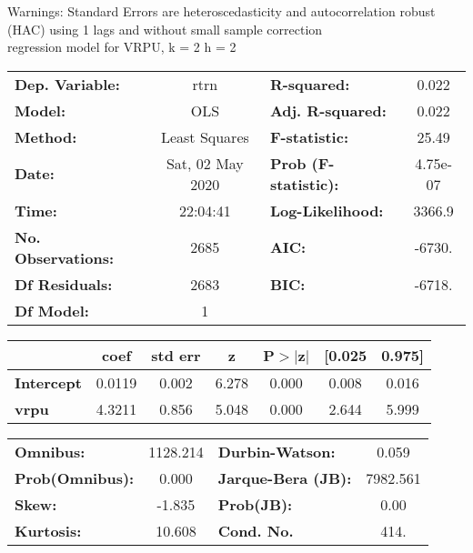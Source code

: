 Warnings: \newline
 [1] Standard Errors are heteroscedasticity and autocorrelation robust (HAC) using 1 lags and without small sample correction\\ 

regression model for VRPU, k = 2 h = 2\begin{center}
\begin{tabular}{lclc}
\toprule
\textbf{Dep. Variable:}    &       rtrn       & \textbf{  R-squared:         } &     0.022   \\
\textbf{Model:}            &       OLS        & \textbf{  Adj. R-squared:    } &     0.022   \\
\textbf{Method:}           &  Least Squares   & \textbf{  F-statistic:       } &     25.49   \\
\textbf{Date:}             & Sat, 02 May 2020 & \textbf{  Prob (F-statistic):} &  4.75e-07   \\
\textbf{Time:}             &     22:04:41     & \textbf{  Log-Likelihood:    } &    3366.9   \\
\textbf{No. Observations:} &        2685      & \textbf{  AIC:               } &    -6730.   \\
\textbf{Df Residuals:}     &        2683      & \textbf{  BIC:               } &    -6718.   \\
\textbf{Df Model:}         &           1      & \textbf{                     } &             \\
\bottomrule
\end{tabular}
\begin{tabular}{lcccccc}
                   & \textbf{coef} & \textbf{std err} & \textbf{z} & \textbf{P$> |$z$|$} & \textbf{[0.025} & \textbf{0.975]}  \\
\midrule
\textbf{Intercept} &       0.0119  &        0.002     &     6.278  &         0.000        &        0.008    &        0.016     \\
\textbf{vrpu}      &       4.3211  &        0.856     &     5.048  &         0.000        &        2.644    &        5.999     \\
\bottomrule
\end{tabular}
\begin{tabular}{lclc}
\textbf{Omnibus:}       & 1128.214 & \textbf{  Durbin-Watson:     } &    0.059  \\
\textbf{Prob(Omnibus):} &   0.000  & \textbf{  Jarque-Bera (JB):  } & 7982.561  \\
\textbf{Skew:}          &  -1.835  & \textbf{  Prob(JB):          } &     0.00  \\
\textbf{Kurtosis:}      &  10.608  & \textbf{  Cond. No.          } &     414.  \\
\bottomrule
\end{tabular}
\end{center}

